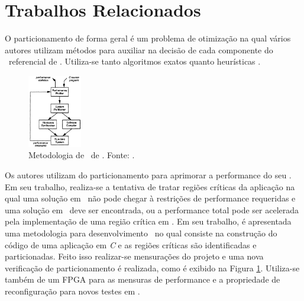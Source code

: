 \section{Trabalhos Relacionados} \label{chap:relacionados}


	O particionamento de forma geral é um problema de otimização na qual vários autores utilizam métodos para auxiliar na decisão de cada componente do \design\ referencial de \software. Utiliza-se tanto algoritmos exatos quanto heurísticas \cite{Arato2005}.

	\begin{figure}[!b] \centering
    	\vspace{-15pt}
		\includegraphics[width=0.21\textwidth]{img/rt-edwards_method.png}
        \vspace{-10pt}
		\caption{Metodologia de \codesign\ de \cite{Edwards1994}. Fonte: \cite{Edwards1994}.}
		\label{fig:tr-edwards_method}
	\end{figure}
	Os autores \cite{Edwards1994} utilizam do particionamento para aprimorar a performance do seu \software. Em seu trabalho, realiza-se a tentativa de tratar regiões críticas da aplicação na qual uma solução em \software\ não pode chegar à restrições de performance requeridas e uma solução em \hardware\ deve ser encontrada, ou a performance total pode ser acelerada pela implementação de uma região crítica em \hardware.
	Em seu trabalho, é apresentada uma metodologia para desenvolvimento \codesign\ no qual consiste na construção do código de uma aplicação em \textit{C} e as regiões críticas são identificadas e particionadas. Feito isso realizar-se mensurações do projeto e uma nova verificação de particionamento é realizada, como é exibido na Figura \ref{fig:tr-edwards_method}.
	Utiliza-se também de um FPGA para as mensuras de performance e a propriedade de reconfiguração para novos testes em \hardware.

